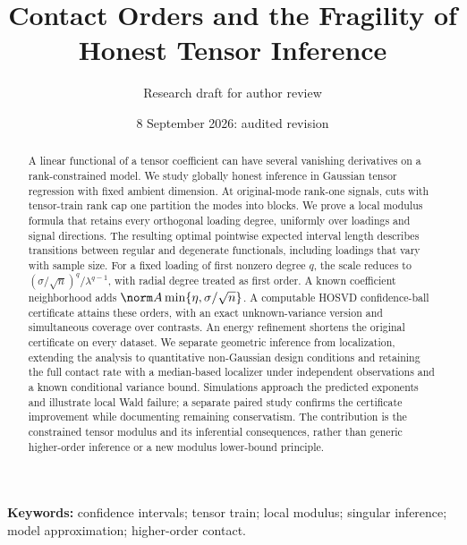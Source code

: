 \documentclass[11pt]{article}
\title{Contact Orders and the Fragility of Honest Tensor Inference}
\author{Research draft for author review}
\date{8 September 2026: audited revision}
\begin{document}
\maketitle
\begin{abstract}
A linear functional of a tensor coefficient can have several vanishing derivatives on a rank-constrained model. We study globally honest inference in Gaussian tensor regression with fixed ambient dimension. At original-mode rank-one signals, cuts with tensor-train rank cap one partition the modes into blocks. We prove a local modulus formula that retains every orthogonal loading degree, uniformly over loadings and signal directions. The resulting optimal pointwise expected interval length describes transitions between regular and degenerate functionals, including loadings that vary with sample size. For a fixed loading of first nonzero degree $q$, the scale reduces to $(\sigma/\sqrt n)^q/\lambda^{q-1}$, with radial degree treated as first order. A known coefficient neighborhood adds $\norm A\min\{\eta,\sigma/\sqrt n\}$. A computable HOSVD confidence-ball certificate attains these orders, with an exact unknown-variance version and simultaneous coverage over contrasts. An energy refinement shortens the original certificate on every dataset. We separate geometric inference from localization, extending the analysis to quantitative non-Gaussian design conditions and retaining the full contact rate with a median-based localizer under independent observations and a known conditional variance bound. Simulations approach the predicted exponents and illustrate local Wald failure; a separate paired study confirms the certificate improvement while documenting remaining conservatism. The contribution is the constrained tensor modulus and its inferential consequences, rather than generic higher-order inference or a new modulus lower-bound principle.
\end{abstract}
\noindent\textbf{Keywords:} confidence intervals; tensor train; local modulus; singular inference; model approximation; higher-order contact.








\clearpage

\clearpage
\appendix



\end{document}
